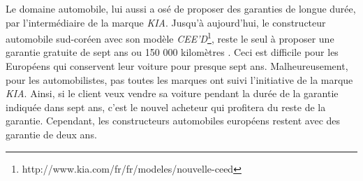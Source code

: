 \smallbreak
Le domaine automobile, lui aussi a osé de proposer  des garanties de longue durée, par l’intermédiaire de la marque \textit{KIA}. Jusqu’à aujourd'hui, le constructeur automobile sud-coréen avec son modèle \textit{CEE’D}\footnote{http://www.kia.com/fr/fr/modeles/nouvelle-ceed}, reste le seul à proposer une garantie gratuite de sept ans ou 150 000 kilomètres \cite{kia}. Ceci est difficile pour les Européens qui conservent leur voiture pour presque sept ans. Malheureusement, pour les automobilistes, pas toutes les marques ont suivi l’initiative de la marque \textit{KIA}. Ainsi, si le client veux vendre sa voiture pendant la durée de la garantie indiquée dans sept ans, c'est le nouvel acheteur qui profitera du reste de la garantie. Cependant, les constructeurs automobiles européens restent avec des garantie de deux ans.


